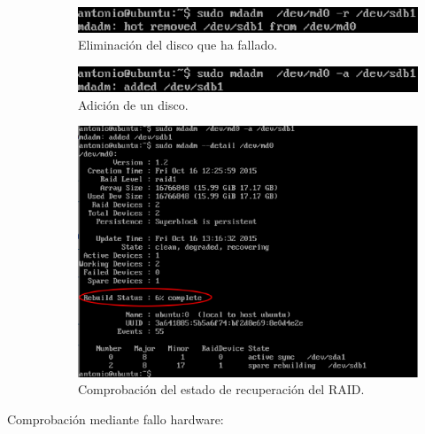 \begin{description}
            \begin{figure}[H]
                \begin{center}
                    \includegraphics[scale=0.8]{Imagenes/remove.eps}
                    \caption{Eliminación del disco que ha fallado.}
                    \label{fig6}
                \end{center}
            \end{figure}

            \begin{figure}[H]
                \begin{center}
                    \includegraphics[scale=0.8]{Imagenes/add.eps}
                    \caption{Adición de un disco.}
                    \label{fig7}
                \end{center}
            \end{figure}

            \begin{figure}[H]
                \begin{center}
                    \includegraphics[scale=0.5]{Imagenes/estado_recuperacion.eps}
                    \caption{Comprobación del estado de recuperación del RAID.}
                    \label{fig8}
                \end{center}
            \end{figure}
    \item[Comprobación mediante fallo hardware: ]
    

\end{description}
